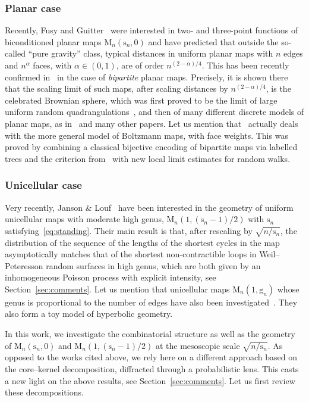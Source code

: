 \documentclass[JEP,XML,SOM,Unicode,NoFloatCountersInSection,NoEqCountersInSection]{cedram}
\theoremstyle{plain}
\theoremstyle{definition}
\theoremstyle{remark}
\newcommand{\Map}{\mathrm{M}}
\newcommand{\gen}{\mathrm{g}}
\newcommand{\spar}{\mathrm{s}}
\begin{document}
\subsubsection*{Planar case} Recently, Fusy and Guitter~\cite{FG14} were interested in two- and three-point functions of biconditioned planar maps $ \Map_n(\spar_n,0)$ and have predicted that outside the so-called ``pure gravity'' class, typical distances in uniform planar maps with $n$ edges and $n^\alpha$ faces, with $\alpha \in (0,1)$, are of order $n^{(2-\alpha)/4}$. This has been recently confirmed in~\cite{KM21b} in the case of \emph{bipartite} planar maps.
Precisely, it is shown there that the scaling limit of such maps, after scaling distances by $n^{(2- \alpha)/4}$, is the celebrated Brownian sphere, which was first proved to be the limit of large uniform random quadrangulations~\cite{LG13, Mie13}, and then of many different discrete models of planar maps, as in~\cite{ABA21,BJM14,NR18,CLG19,Mar22}
and many other papers. Let us mention that~\cite{KM21b} actually deals with the more general model of Boltzmann maps, with face weights. This was proved by combining a classical bijective encoding of bipartite maps via labelled trees and the criterion from~\cite{Mar22} with new local limit estimates for random walks.

\subsubsection*{Unicellular case} Very recently, Janson \& Louf~\cite{JL21b} have been interested in the geometry of uniform unicellular maps with moderate high genus, \ie $\Map_n(1, (\spar_{n}-1)/2)$ with $\spar_n$ satisfying~\eqref{eq:standing}. Their main result is that, after rescaling by $ \sqrt{n/\spar_n}$, the distribution of the sequence of the lengths of the shortest cycles in the map asymptotically matches that of the shortest non-contractible loops in Weil--Peteresson random surfaces in high genus, which are both given by an inhomogeneous Poisson process with explicit intensity, see Section~\ref{sec:comments}. Let us mention that unicellular maps $ \Map_n(1, \gen_{n})$ whose genus is proportional to the number of edges
have also been investigated~\cite{ACCR13,JL22,Ray15}. They also form a toy model of hyperbolic geometry.

\smallskip
In this work, we investigate the combinatorial structure as well as the geometry of $\Map_n(\spar_{n},0)$ and $\Map_n(1, (\spar_{n}-1)/2)$ at the mesoscopic scale $ \sqrt{n/ \spar_n}$. As opposed to the works cited above, we rely here on a different approach based on the core--kernel decomposition, diffracted through a probabilistic lens. This casts a new light on the above results, see Section~\ref{sec:comments}. Let us first review these decompositions.
\end{document}
